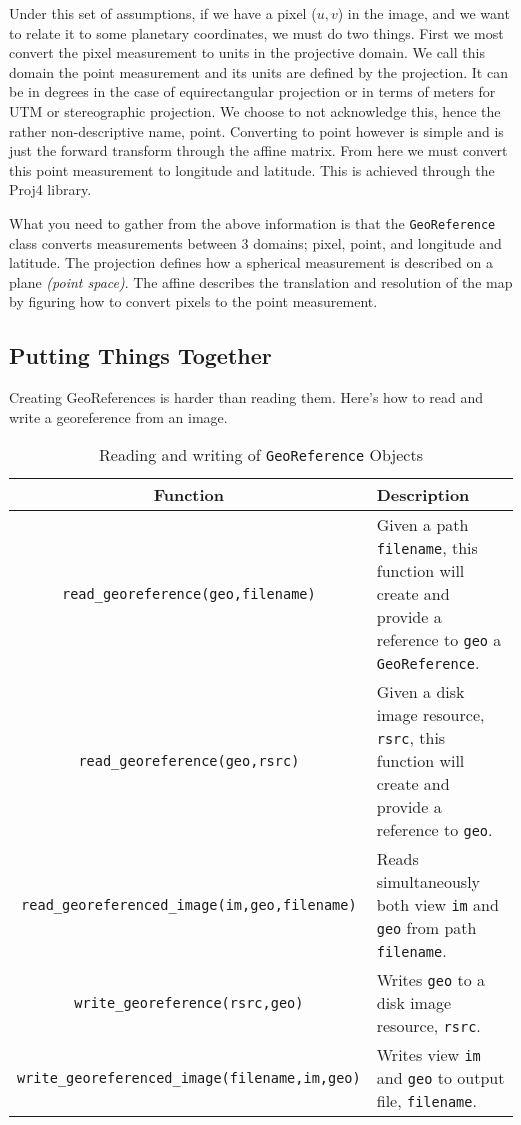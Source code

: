 Under this set of assumptions, if we have a pixel ($u,v$) in the image,
and we want to relate it to some planetary coordinates, we must do two
things. First we most convert the pixel measurement to units in the
projective domain. We call this domain the point measurement and its
units are defined by the projection. It can be in degrees in the case
of equirectangular projection or in terms of meters for UTM or
stereographic projection. We choose to not acknowledge this, hence the
rather non-descriptive name, point. Converting to point however is
simple and is just the forward transform through the affine
matrix. From here we must convert this point measurement to longitude
and latitude. This is achieved through the Proj4 library.

What you need to gather from the above information is that the
\verb#GeoReference# class converts measurements between 3 domains; pixel,
point, and longitude and latitude. The projection defines how a
spherical measurement is described on a plane \emph{(point
  space)}. The affine describes the translation and resolution of the
map by figuring how to convert pixels to the point measurement.

\subsection{Putting Things Together}

Creating GeoReferences is harder than reading them. Here’s how to read
and write a georeference from an image.

\begin{table}[htb]\begin{centering}
\begin{tabular}{|c|p{5 in}|} \hline
Function & Description \\ \hline \hline
\verb#read_georeference(geo,filename)# & Given a path \verb#filename#, this function will create and provide a reference to \verb#geo# a \verb#GeoReference#. \\ \hline
\verb#read_georeference(geo,rsrc)# & Given a disk image resource, \verb#rsrc#, this function will create and provide a reference to \verb#geo#. \\ \hline
\verb#read_georeferenced_image(im,geo,filename)# & Reads simultaneously both view \verb#im# and \verb#geo# from path \verb#filename#.\\ \hline
\verb#write_georeference(rsrc,geo)# & Writes \verb#geo# to a disk image resource, \verb#rsrc#. \\ \hline
\verb#write_georeferenced_image(filename,im,geo)# & Writes view \verb#im# and \verb#geo# to output file, \verb#filename#. \\ \hline
\end{tabular}
\caption{Reading and writing of {\tt GeoReference} Objects}
\end{centering}
\end{table}

